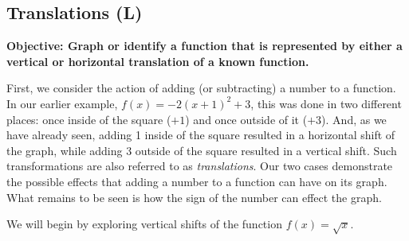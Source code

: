 \documentclass[12pt]{book}
\theoremstyle{definition}
\begin{document}
\subsection{Translations (L)}
{\bf Objective: Graph or identify a function that is represented by either a vertical or horizontal translation of a known function.}\par
First, we consider the action of adding (or subtracting) a number to a function.  In our earlier example, $f(x)=-2(x+1)^2+3$, this was done in two different places: once inside of the square ($+1$) and once outside of it ($+3$).  And, as we have already seen, adding 1 inside of the square resulted in a horizontal shift of the graph, while adding 3 outside of the square resulted in a vertical shift.  Such transformations are also referred to as {\it translations}.  Our two cases demonstrate the possible effects that adding a number to a function can have on its graph.  What remains to be seen is how the sign of the number can effect the graph.\par
We will begin by exploring vertical shifts of the function $f(x)=\sqrt{x}$.
\end{document}
